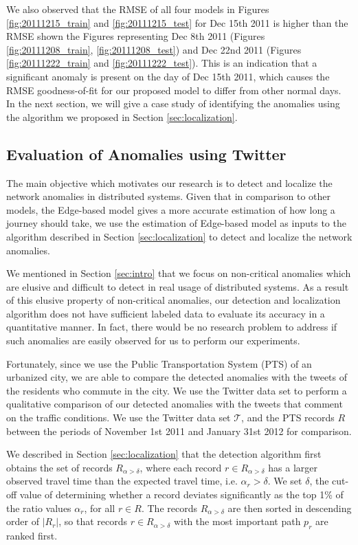 \documentclass[conference]{IEEEtran.1.8}
\begin{document}
We also observed that the RMSE of all four models in Figures \ref{fig:20111215_train} and \ref{fig:20111215_test} for Dec 15th 2011 is higher than the RMSE shown the Figures representing Dec 8th 2011 (Figures \ref{fig:20111208_train}, \ref{fig:20111208_test}) and Dec 22nd 2011 (Figures \ref{fig:20111222_train} and \ref{fig:20111222_test}). This is an indication that a significant anomaly is present on the day of Dec 15th 2011, which causes the RMSE goodness-of-fit for our proposed model to differ from other normal days. In the next section, we will give a case study of identifying the anomalies using the algorithm we proposed in Section \ref{sec:localization}.

\subsection{Evaluation of Anomalies using Twitter}

The main objective which motivates our research is to detect and localize the network anomalies in distributed systems. Given that in comparison to other models, the Edge-based model gives a more accurate estimation of how long a journey should take, we use the estimation of Edge-based model as inputs to the algorithm described in Section \ref{sec:localization} to detect and localize the network anomalies.

We mentioned in Section \ref{sec:intro} that we focus on non-critical anomalies which are elusive and difficult to detect in real usage of distributed systems. As a result of this elusive property of non-critical anomalies, our detection and localization algorithm does not have sufficient labeled data to evaluate its accuracy in a quantitative manner. In fact, there would be no research problem to address if such anomalies are easily observed for us to perform our experiments.

Fortunately, since we use the Public Transportation System (PTS) of an urbanized city, we are able to compare the detected anomalies with the tweets of the residents who commute in the city. We use the Twitter data set %
to perform a qualitative comparison of our detected anomalies with the tweets that comment on the traffic conditions. We use the Twitter data set $\mathcal{T}$, and the PTS records $R$ between the periods of November 1st 2011 and January 31st 2012 for comparison.

We described in Section \ref{sec:localization} that the detection algorithm first obtains the set of records $R_{\alpha > \delta}$, where each record $r \in R_{\alpha > \delta}$ has a larger observed travel time than the expected travel time, i.e. $\alpha_r > \delta$. We set $\delta$, the cut-off value of determining whether a record deviates significantly as the top 1\% of the ratio values $\alpha_r$, for all $r \in R$. The records $R_{\alpha > \delta}$ are then sorted in descending order of $|R_r|$, so that records $r \in R_{\alpha > \delta}$ with the most important path $p_r$ are ranked first. 
\end{document}
